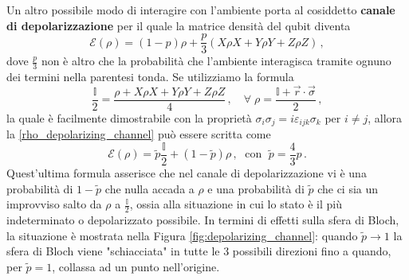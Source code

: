 \begin{esempio}
    Un altro possibile modo di interagire con l'ambiente porta al cosiddetto \textbf{canale di depolarizzazione} per il quale la matrice densità del qubit diventa
    \begin{equation}\label{rho_depolarizing_channel}
        \mathcal{E}(\rho) = (1-p) \rho + \frac{p}{3} \left( X \rho X + Y \rho Y + Z \rho Z \right) \, ,
    \end{equation}
    dove $\frac{p}{3}$ non è altro che la probabilità che l'ambiente interagisca tramite ognuno dei termini nella parentesi tonda. Se utilizziamo la formula 
    \begin{equation*}
        \frac{\mathbb{I}}{2} = \frac{\rho + X \rho X + Y \rho Y + Z \rho Z}{4} \, , \quad \forall \; \rho = \frac{\mathbb{I}+ \vec{r} \cdot \vec{\sigma}}{2} \, ,
    \end{equation*}
    la quale è facilmente dimostrabile con la proprietà $\sigma_i \sigma_j = i \varepsilon_{ijk} \sigma_k$ per $i \neq j$, allora la \eqref{rho_depolarizing_channel} può essere scritta come
    \begin{equation}
        \mathcal{E}(\rho) = \tilde p \frac{\mathbb{I}}{2} + (1 - \tilde p) \rho \, , \; \text{ con } \; \tilde p = \frac{4}{3} p \, .
    \end{equation}
    Quest'ultima formula asserisce che nel canale di depolarizzazione vi è una probabilità di $1-\tilde p$ che nulla accada a $\rho$ e una probabilità di $\tilde p$ che ci sia un improvviso salto da $\rho$ a $\frac{\mathbb{I}}{2}$, ossia alla situazione in cui lo stato è il più indeterminato o depolarizzato possibile. In termini di effetti sulla sfera di Bloch, la situazione è mostrata nella Figura \ref{fig:depolarizing_channel}: quando $\tilde p \to 1$ la sfera di Bloch viene "schiacciata" in tutte le 3 possibili direzioni fino a quando, per $\tilde p = 1$, collassa ad un punto nell'origine. 
    \begin{figure}[!ht]
	\centering	
	 \quad

\end{figure}
\end{esempio}
